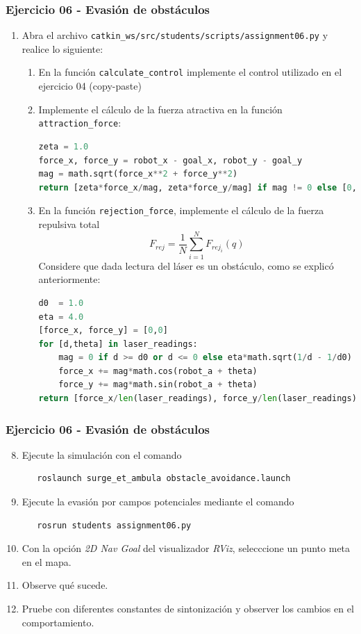 \begin{frame}[containsverbatim]\frametitle{Ejercicio 06 - Evasión de obstáculos}
  \begin{enumerate}
  \item Abra el archivo \texttt{catkin\_ws/src/students/scripts/assignment06.py} y realice lo siguiente:
    \begin{enumerate}
    \item En la función \texttt{calculate\_control} implemente el control utilizado en el ejercicio 04 (copy-paste)
    \item Implemente el cálculo de la fuerza atractiva en la función \texttt{attraction\_force}:
      \begin{lstlisting}[language=Python,firstnumber=65]
zeta = 1.0
force_x, force_y = robot_x - goal_x, robot_y - goal_y
mag = math.sqrt(force_x**2 + force_y**2)
return [zeta*force_x/mag, zeta*force_y/mag] if mag != 0 else [0,0]
\end{lstlisting}
    \item En la función \texttt{rejection\_force}, implemente el cálculo de la fuerza repulsiva total
      \[F_{rej} = \frac{1}{N}\sum_{i=1}^N F_{rej_i}(q)\]
      Considere que dada lectura del láser es un obstáculo, como se explicó anteriormente:
      \begin{lstlisting}[language=Python,firstnumber=65]
d0  = 1.0
eta = 4.0  
[force_x, force_y] = [0,0]
for [d,theta] in laser_readings:
    mag = 0 if d >= d0 or d <= 0 else eta*math.sqrt(1/d - 1/d0)
    force_x += mag*math.cos(robot_a + theta)
    force_y += mag*math.sin(robot_a + theta)
return [force_x/len(laser_readings), force_y/len(laser_readings)]
  \end{lstlisting}
\end{enumerate}
\end{enumerate}
\end{frame}

\begin{frame}[containsverbatim]\frametitle{Ejercicio 06 - Evasión de obstáculos}
  \begin{enumerate}    
\setcounter{enumi}{7}
  \item Ejecute la simulación con el comando
    \begin{verbatim}
   roslaunch surge_et_ambula obstacle_avoidance.launch
\end{verbatim}
  \item Ejecute la evasión por campos potenciales mediante el comando
\begin{verbatim}
   rosrun students assignment06.py
\end{verbatim}
  \item Con la opción \textit{2D Nav Goal} del visualizador \textit{RViz}, selecccione un punto meta en el mapa.
  \item Observe qué sucede.
  \item Pruebe con diferentes constantes de sintonización y observer los cambios en el comportamiento. 
  \end{enumerate}
\end{frame}


